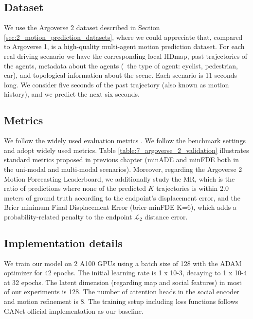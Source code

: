 \subsection{Dataset}
\label{subsec:7_experimental_results_dataset}

We use the Argoverse 2 \cite{wilson2023argoverse} dataset described in Section \ref{sec:2_motion_prediction_datasets}, where we could appreciate that, compared to Argoverse 1, is a high-quality multi-agent motion prediction dataset. For each real driving scenario we have the corresponding local \ac{HDmap}, past trajectories of the agents, metadata about the agents (\eg \ the type of agent: cyclist, pedestrian, car), and topological information about the scene. Each scenario is 11 seconds long. We consider five seconds of the past trajectory (also known as motion history), and we predict the next six seconds. 

\subsection{Metrics}
\label{subsec:7_experimental_results_metrics}

We follow the widely used evaluation metrics \cite{zeng2021lanercnn,gu2021densetntwaymo,ye2021tpcn}. We follow the benchmark settings and adopt widely used metrics. Table \ref{table:7_argoverse_2_validation} illustrates standard metrics proposed in previous chapter (\ac{minADE} and \ac{minFDE} both in the uni-modal and multi-modal scenarios). Moreover, regarding the Argoverse 2 Motion Forecasting Leaderboard, we additionally study the MR, which is the ratio of predictions where none of the predicted $K$ trajectories is within 2.0 meters of ground truth according to the endpoint's displacement error, and the Brier minimum Final Displacement Error (brier-\ac{minFDE} K=6), which adds a probability-related penalty to the endpoint $\mathcal{L}_2$ distance error. 

\subsection{Implementation details}
\label{subsec:7_experimental_results_implementation_details}

We train our model on 2 A100 GPUs using a batch size of 128 with the \ac{ADAM} optimizer for 42 epochs. The initial learning rate is 1 x 10-3, decaying to 1 x 10-4 at 32 epochs. The latent dimension (regarding map and social features) in most of our experiments is 128. The number of attention heads in the social encoder and motion refinement is 8. The training setup including loss functions follows GANet \cite{wang2022ganet} official implementation as our baseline.

